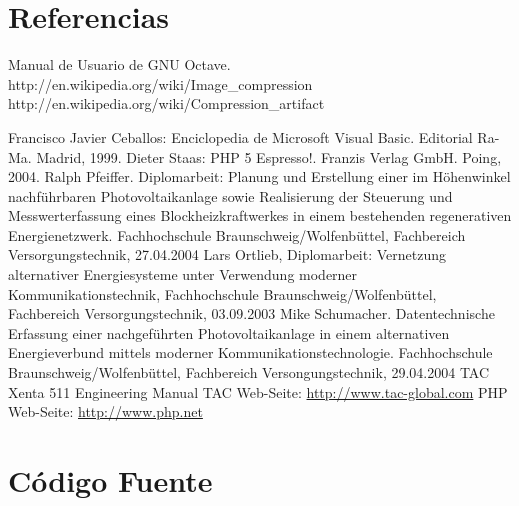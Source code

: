 \documentclass[twocolumn,a4paper,10pt]{article}
\begin{document}
\section*{Referencias}
\begin{thebibliography}{99}
    
     Manual de Usuario de GNU Octave.
     http://en.wikipedia.org/wiki/Image\_compression
     http://en.wikipedia.org/wiki/Compression\_artifact

     Francisco Javier Ceballos: Enciclopedia de Microsoft Visual
        Basic. Editorial Ra-Ma. Madrid, 1999.
     Dieter Staas: PHP 5 Espresso!. Franzis Verlag GmbH.
        Poing, 2004.
     Ralph Pfeiffer. Diplomarbeit: Planung und
        Erstellung einer im Höhenwinkel nachführbaren Photovoltaikanlage
        sowie Realisierung der Steuerung und Messwerterfassung eines
        Blockheizkraftwerkes in einem bestehenden regenerativen
        Energienetzwerk. Fachhochschule Braunschweig/Wolfenbüttel,
        Fachbereich Versorgungstechnik, 27.04.2004
    Lars Ortlieb, Diplomarbeit: Vernetzung alternativer
        Energiesysteme unter Verwendung moderner Kommunikationstechnik,
        Fachhochschule Braunschweig/Wolfenbüttel, Fachbereich
        Versorgungstechnik, 03.09.2003
     Mike Schumacher. Datentechnische Erfassung einer
        nachgeführten Photovoltaikanlage in einem alternativen
        Energieverbund mittels moderner Kommunikationstechnologie.
        Fachhochschule Braunschweig/Wolfenbüttel, Fachbereich
        Versongungstechnik, 29.04.2004
     TAC Xenta 511 Engineering Manual
     TAC Web-Seite: \url{http://www.tac-global.com}
     PHP Web-Seite: \url{http://www.php.net}
\end{thebibliography}

\section*{Código Fuente}
    
    
\end{document}
